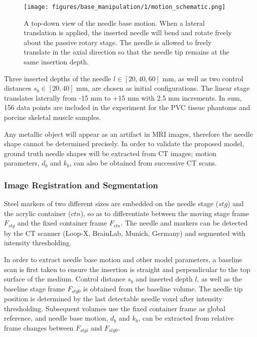 \begin{figure}[t]
  \centering
  \texttt{[image: figures/base\_manipulation/1/motion\_schematic.png]}
  \caption{A top-down view of the needle base motion. When a lateral translation is applied, the inserted needle will bend and rotate freely about the passive rotary stage. The needle is allowed to freely translate in the axial direction so that the needle tip remains at the same insertion depth.}
  \label{fig:chap-3-motion-schematic}
\end{figure}

Three inserted depths of the needle $l \in [20, 40, 60]$ mm, as well as two control distances $s_b \in [20, 40]$ mm, are chosen as initial configurations. The linear stage translates laterally from -15 mm to +15 mm with 2.5 mm increments. In sum, 156 data points are included in the experiment for the PVC tissue phantoms and porcine skeletal muscle samples.

Any metallic object will appear as an artifact in MRI images, therefore the needle shape cannot be determined precisely. In order to validate the proposed model, ground truth needle shapes will be extracted from CT images; motion parameters, $d_b$ and $k_b$, can also be obtained from successive CT scans.

\subsubsection{Image Registration and Segmentation}
\label{sec:chap-3-image-reg-and-seg}
Steel markers of two different sizes are embedded on the needle stage ($stg$) and the acrylic container ($ctn$), so as to differentiate between the moving stage frame $F_{stg}$ and the fixed container frame $F_{ctn}$. The needle and markers can be detected by the CT scanner (Loop-X, BrainLab, Munich, Germany) and segmented with intensity thresholding.

In order to extract needle base motion and other model parameters, a baseline scan is first taken to ensure the insertion is straight and perpendicular to the top surface of the medium. Control distance $s_b$ and inserted depth $l$, as well as the baseline stage frame $F_{stg0}$ is obtained from the baseline volume. The needle tip position is determined by the last detectable needle voxel after intensity thresholding. Subsequent volumes use the fixed container frame as global reference, and needle base motion, $d_b$ and $k_b$, can be extracted from relative frame changes between $F_{stgi}$ and $F_{stg0}$.


